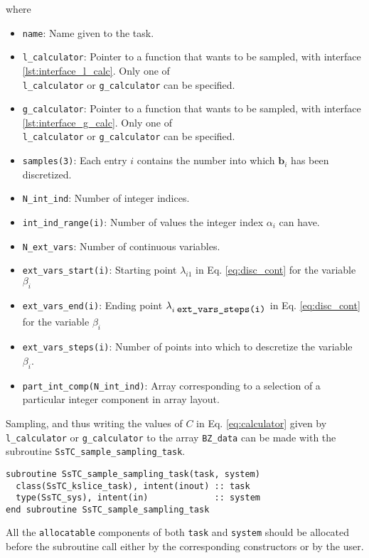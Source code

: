\documentclass[10pt,a4paper]{article}
\begin{document}
where
\begin{itemize}
\item \verb|name|: Name given to the task.
\item \verb|l_calculator|: Pointer to a function that wants to be sampled, with interface \ref{lst:interface_l_calc}. Only one of \\ \verb|l_calculator| or \verb|g_calculator| can be specified.
\item \verb|g_calculator|: Pointer to a function that wants to be sampled, with interface \ref{lst:interface_g_calc}. Only one of \\ \verb|l_calculator| or \verb|g_calculator| can be specified.
\item \verb|samples(3)|: Each entry $i$ contains the number into which $\bm{b}_i$ has been discretized.
\item \verb|N_int_ind|: Number of integer indices.
\item \verb|int_ind_range(i)|: Number of values the integer index $\alpha_i$ can have.
\item \verb|N_ext_vars|: Number of continuous variables.
\item \verb|ext_vars_start(i)|: Starting point $\lambda_{i1}$ in Eq. \eqref{eq:disc_cont} for the variable $\beta_i$
\item \verb|ext_vars_end(i)|: Ending point $\lambda_{i\;\verb|ext_vars_steps(i)|}$ in Eq. \eqref{eq:disc_cont} for the variable $\beta_i$
\item \verb|ext_vars_steps(i)|: Number of points into which to descretize the variable $\beta_i$.
\item \verb|part_int_comp(N_int_ind)|: Array corresponding to a selection of a particular integer component in array layout.
\end{itemize}
Sampling, and thus writing the values of $C$ in Eq. \eqref{eq:calculator} given by \verb|l_calculator| or \verb|g_calculator| to the array \verb|BZ_data| can be made with the subroutine \verb|SsTC_sample_sampling_task|.
\begin{lstlisting}[caption={Interface of the ``sampler" sampler.},captionpos=b]
subroutine SsTC_sample_sampling_task(task, system)
  class(SsTC_kslice_task), intent(inout) :: task
  type(SsTC_sys), intent(in)             :: system
end subroutine SsTC_sample_sampling_task
\end{lstlisting}
All the \verb|allocatable| components of both \verb|task| and \verb|system| should be allocated before the subroutine call either by the corresponding constructors or by the user.
\end{document}
